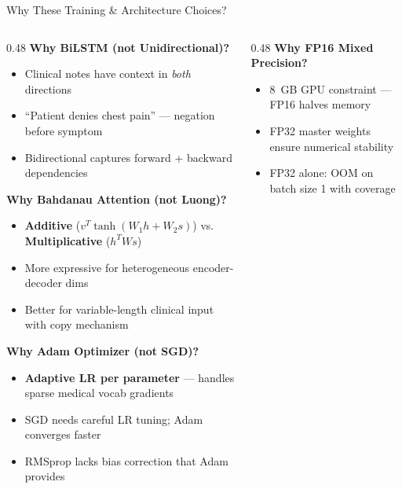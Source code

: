 \documentclass[10pt, aspectratio=169]{beamer}
\begin{document}
\begin{frame}{Why These Training \& Architecture Choices?}
  \footnotesize
  \begin{columns}[T]
    \begin{column}{0.48\textwidth}
      \textbf{Why BiLSTM (not Unidirectional)?}
      \begin{itemize}\setlength{\itemsep}{0pt}
        \item Clinical notes have context in \emph{both} directions
        \item ``Patient denies chest pain'' --- negation before symptom
        \item Bidirectional captures forward + backward dependencies
      \end{itemize}

      \vspace{0.1cm}
      \textbf{Why Bahdanau Attention (not Luong)?}
      \begin{itemize}\setlength{\itemsep}{0pt}
        \item \textbf{Additive} ($v^T\tanh(W_1 h + W_2 s)$) vs. \textbf{Multiplicative} ($h^T W s$)
        \item More expressive for heterogeneous encoder-decoder dims
        \item Better for variable-length clinical input with copy mechanism
      \end{itemize}

      \vspace{0.1cm}
      \textbf{Why Adam Optimizer (not SGD)?}
      \begin{itemize}\setlength{\itemsep}{0pt}
        \item \textbf{Adaptive LR per parameter} --- handles sparse medical vocab gradients
        \item SGD needs careful LR tuning; Adam converges faster
        \item RMSprop lacks bias correction that Adam provides
      \end{itemize}
    \end{column}
    \begin{column}{0.48\textwidth}
      \textbf{Why FP16 Mixed Precision?}
      \begin{itemize}\setlength{\itemsep}{0pt}
        \item 8~GB GPU constraint --- FP16 halves memory
        \item FP32 master weights ensure numerical stability
        \item FP32 alone: OOM on batch size 1 with coverage
      \end{itemize}


\end{column}
\end{columns}
\end{frame}
\end{document}
